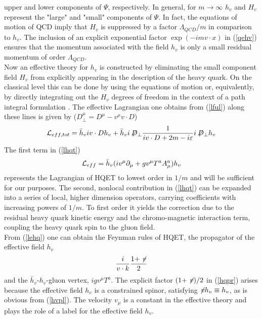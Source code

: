upper and lower components of $\Psi$, respectively. In general, for
$m\to\infty$ $h_v$ and $H_v$ represent the "large" and "small" components
of $\Psi$. In fact, the equations of motion of QCD imply that $H_v$ is
suppressed by a factor $\Lambda_{QCD}/m$ in comparison to $h_v$.
The inclusion of an explicit exponential factor $\exp(-i mv\cdot x)$ in
(\ref{qehv}) ensures that the momentum associated with the field $h_v$
is only a small residual momentum of order $\Lambda_{QCD}$.
\\
Now an effective theory for $h_v$ is constructed by eliminating the
small component field $H_v$ from explicitly appearing in the
description of the heavy quark. On the classical level this can be done
by using the equations of motion or, equivalently, by directly
integrating out the $H_v$ degrees of freedom in the context of a path
integral formulation \cite{manneletal:92}.  The effective Lagrangian
one obtains from (\ref{lful}) along these lines is given by
($D^\mu_\perp=D^\mu-v^\mu v\cdot D$)
\begin{equation}\label{lhqt}
{\cal L}_{eff,tot}=\bar h_v iv\cdot D h_v+\bar h_v i\not\!\! D_\perp
\frac{1}{iv\cdot D+2m-i\varepsilon}i\not\!\! D_\perp h_v
\end{equation}
The first term in (\ref{lhqt})
\begin{equation}\label{lehq}
{\cal L}_{eff}=\bar h_v (i v^\mu\partial_\mu+g v^\mu T^a A^a_\mu)h_v
\end{equation}
represents the Lagrangian of HQET to lowest order in $1/m$ and will be 
sufficient for our purposes. The second, nonlocal contribution in
(\ref{lhqt}) can be expanded into a series of local, higher dimension
operators, carrying coefficients with increasing powers of $1/m$. To first
order it yields the correction due to the residual heavy quark kinetic
energy and the chromo-magnetic interaction term, coupling the heavy
quark spin to the gluon field. 
\\
From (\ref{lehq}) one can obtain the Feynman rules of HQET, the
propagator of the effective field $h_v$
\begin{equation}\label{hqpr}
\frac{i}{v\cdot k} \frac{1+\not\! v}{2}
\end{equation}
and the $\bar h_v$-$h_v$-gluon vertex, $igv^\mu T^a$. The explicit
factor $(1+\not\! v)/2$ in (\ref{hqpr}) arises because the effective
field $h_v$ is a constrained spinor, satisfying $\not\! v h_v\equiv h_v$,
as is obvious from (\ref{hvpl}). The velocity $v_\mu$ is a constant in the
effective theory and plays the role of a label for the effective field $h_v$.
